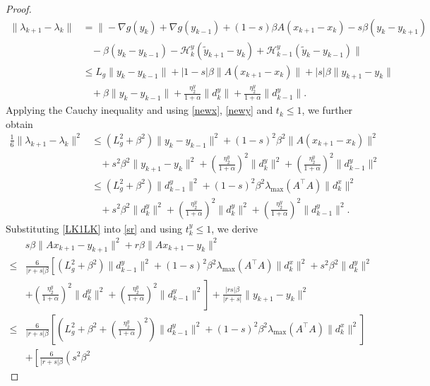 \documentclass[pdflatex,sn-mathphys-num]{sn-jnl}%
\theoremstyle{thmstyleone}%
\theoremstyle{thmstyletwo}%
\theoremstyle{thmstylethree}%
\begin{document}
\begin{proof}
	\begin{align}
		\|\lambda_{k+1}-\lambda_{k}\|
		&= \|-\nabla g(y_{k})+\nabla g(y_{k-1})+(1-s)\beta A(x_{k+1}-x_{k})-s\beta(y_{k}-y_{k+1})\nonumber\\
		&\ \ \ \ -\beta(y_k-y_{k-1})-\mathcal{H}_k^y (\tilde{y}_{k+1}-y_{k})+\mathcal{H}_{k-1}^y (\tilde{y}_{k}-y_{k-1})
		\| \nonumber\\
		&\leq L_g\|y_{k}-y_{k-1}\|+|1-s|\beta\|A(x_{k+1}-x_{k})\|+|s|\beta\|y_{k+1}-y_{k}\|\nonumber\\
		&\ \ \ \ +\beta\|y_k -y_{k-1}\| +\frac{\eta_2^y}{1+\alpha}\|d_k^y\|+\frac{\eta_2^y}{1+\alpha}\| d_{k-1}^y\|. \label{lk1lk}
	\end{align}
	Applying the Cauchy inequality and using \eqref{newx}, \eqref{newy} and $t_k\leq 1$, we further obtain
	\begin{align}
		\frac{1}{6}\|\lambda_{k+1}-\lambda_{k}\|^{2}
		&\leq(L_{g}^{2}+\beta^2)\|y_{k}-y_{k-1}\|^{2}+(1-s)^{2}\beta^{2}\|A(x_{k+1}-x_{k})\|^{2}\nonumber\\
		&\ \ \ \ +s^{2}\beta^{2}\|y_{k+1}-y_{k}\|^{2}  +\left(\frac{\eta_2^y}{1+\alpha}\right)^2\|d_k^y\|^2+\left(\frac{\eta_2^y}{1+\alpha}\right)^2\|d_{k-1}^y\|^2 \nonumber\\
		&\leq(L_{g}^{2}+\beta^2)\|d_{k-1}^y\|^{2}+(1-s)^{2}\beta^{2}\lambda_{\max}(A^{\top}A)\|d_{k}^x\|^{2}\nonumber\\
		&\ \ \ \ + s^{2}\beta^{2}\|d_{k}^y\|^{2}+\left(\frac{\eta_2^y}{1+\alpha}\right)^2\|d_k^y\|^2+\left(\frac{\eta_2^y}{1+\alpha}\right)^2\|d_{k-1}^y\|^2. \label{LK1LK}
	\end{align}
	Substituting \eqref{LK1LK} into \eqref{sr} and using $t_k^y\leq 1$, we derive
	\[\begin{aligned}
		&s \beta\|A x_{k+1}-y_{k+1}\|^{2}+r \beta\|A x_{k+1}-y_{k}\|^{2} \\
		\leq &\frac{6}{|r+s|\beta}\left[(L_{g}^{2}+\beta^2)\|d_{k-1}^y\|^{2}
		+(1-s)^{2}\beta^{2}\lambda_{\max}(A^{\top}A)\|d_{k}^x\|^{2}+s^{2}\beta^{2} \|d_{k}^y\|^{2}\right. \\
		&+\left.\left(\frac{\eta_2^y }{1+\alpha}\right)^2\|d_k^y\|^2
		+\left(\frac{\eta_2^y }{1+\alpha}\right)^2\|d_{k-1}^y\|^2\right]
		+\frac{|rs|\beta }{|r+s|}\|y_{k+1}-y_{k}\|^2 \\
		\leq& \frac{6}{|r+s|\beta}\left[\left(L_{g}^{2}+\beta^2+
		\left(\frac{\eta_2^y }{1+\alpha}\right)^2\right)\|d_{k-1}^y\|^{2}
		+(1-s)^{2}\beta^{2}\lambda_{\max}(A^{\top}A)\|d_{k}^x\|^{2}\right] \\
		&+\left[\frac{6}{|r+s|\beta}\left(s^{2}\beta^{2}

\end{aligned}\]
\end{proof}
\end{document}
